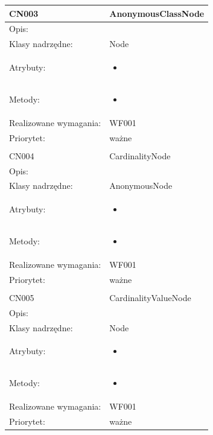 \documentclass[a4paper,10pt]{article}
\begin{document}
\begin{center}
\begin{longtable}{|m{3cm}|m{9cm}|}
CN003 & AnonymousClassNode \\ \hline
Opis: &     \\ \hline
Klasy nadrzędne: & Node     \\ \hline
Atrybuty: & \begin{itemize}
 \item 
\end{itemize}
 \\ \hline
Metody: & \begin{itemize}
 \item 
\end{itemize}
  \\ \hline
Realizowane wymagania: & WF001 \\ \hline
Priorytet: & ważne \\ \hline

\multicolumn{2}{c}{} \\
 \hline

CN004 & CardinalityNode \\ \hline
Opis: &     \\ \hline
Klasy nadrzędne: & AnonymousNode     \\ \hline
Atrybuty: & \begin{itemize}
 \item 
\end{itemize}
 \\ \hline
Metody: & \begin{itemize}
 \item 
\end{itemize}
  \\ \hline
Realizowane wymagania: & WF001 \\ \hline
Priorytet: & ważne  \\ \hline

\multicolumn{2}{c}{} \\
 \hline

CN005 & CardinalityValueNode \\ \hline
Opis: &     \\ \hline
Klasy nadrzędne: & Node     \\ \hline
Atrybuty: & \begin{itemize}
 \item 
\end{itemize}
 \\ \hline
Metody: & \begin{itemize}
 \item 
\end{itemize}
  \\ \hline
Realizowane wymagania: & WF001 \\ \hline
Priorytet: & ważne  \\ \hline


\end{longtable}
\end{center}
\end{document}
